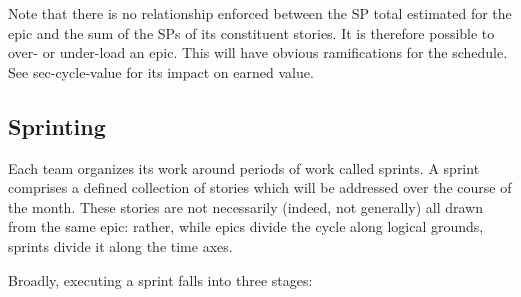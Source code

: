 Note that there is no relationship enforced between the SP total
estimated for the epic and the sum of the SPs of its constituent
stories. It is therefore possible to over- or under-load an epic. This
will have obvious ramifications for the schedule. See sec-cycle-value
for its impact on earned value.

\subsection{Sprinting}\label{sprinting}

Each team organizes its work around periods of work called sprints. A
sprint comprises a defined collection of stories which will be addressed
over the course of the month. These stories are not necessarily (indeed,
not generally) all drawn from the same epic: rather, while epics divide
the cycle along logical grounds, sprints divide it along the time axes.

Broadly, executing a sprint falls into three stages:

